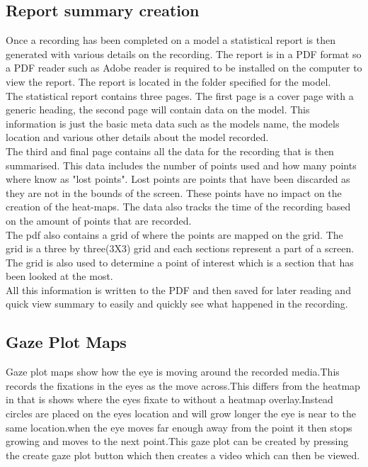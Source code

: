 \subsection{Report summary creation}
Once a recording has been completed on a model a statistical report is then generated with various details on the recording. The report is in a PDF format so a PDF reader such as Adobe reader is required to be installed on the computer to view the report. The report is located in the folder specified for the model.\\
The statistical report contains three pages. The first page is a cover page with a generic heading, the second page will contain data on the model. This information is just the basic meta data such as the models name, the models location and various other details about the model recorded.\\
The third and final page contains all the data for the recording that is then summarised. This data includes the number of points used and how many points where know as "lost points". Lost points are points that have been discarded as they are not in the bounds of the screen. These points have no impact on the creation of the heat-maps. The data also tracks the time of the recording based on the amount of points that are recorded.\\
The pdf also contains a grid of where the points are mapped on the grid. The grid is a three by three(3X3) grid and each sections represent a part of a screen. The grid is also used to determine a point of interest which is a section that has been looked at the most.\\
All this information is written to the PDF and then saved for later reading and quick view summary to easily and quickly see what happened in the recording. \\
\subsection{Gaze Plot Maps}
Gaze plot maps show how the eye is moving around the recorded media.This records the fixations in the eyes as the move across.This differs from the heatmap in that is shows where the eyes fixate to without a heatmap overlay.Instead circles are placed on the eyes location and will grow longer the eye is near to the same location.when the eye moves far enough away from the point it then stops growing and moves to the next point.This gaze plot can be created by pressing the create gaze plot button which then creates a video which can then be viewed. 
\iffalse
